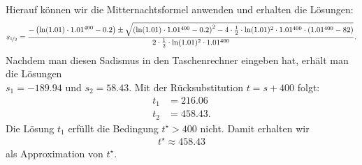 Hierauf können wir die Mitternachtsformel anwenden und erhalten die Lösungen:
\begin{align*}
	s_{\nicefrac{1}{2}}
	=
	\frac{-\left(\ln(1.01) \cdot  1.01^{400}- 0.2\right) \pm 
	\sqrt{\left(\ln(1.01) \cdot  1.01^{400}- 0.2\right)^2 -
		4 \cdot \frac{1}{2} \cdot  \ln(1.01)^2 \cdot 1.01^{400} \cdot (1.01^{400} - 82 )}}
	{2 \cdot \frac{1}{2} \cdot  \ln(1.01)^2 \cdot 1.01^{400 }}.
\end{align*}
Nachdem man diesen Sadismus in den Taschenrechner eingeben hat, erhält man die Lösungen\\
$ s_1 = -189.94 $ und $ s_2 = 58.43 $.
Mit der Rücksubstitution $ t = s + 400 $ folgt:
\begin{align*}
	t_1 &= 216.06\\
	t_2 &= 458.43.
\end{align*}
Die Lösung $ t_1 $ erfüllt die Bedingung $ t^\star > 400  $ nicht. Damit erhalten wir
\begin{align*}
	t^\star \approx 458.43
\end{align*}  
als Approximation von $ t^\star $.
\newpage
